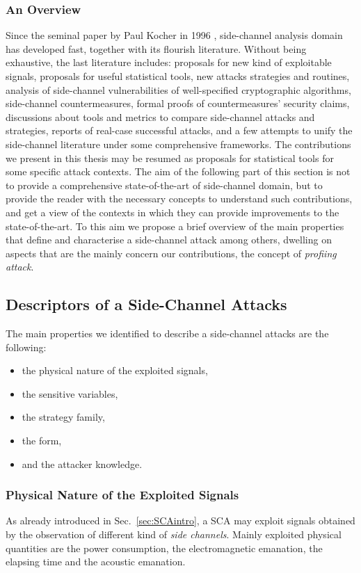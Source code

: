 \subsubsection{An Overview}
Since the seminal paper by Paul Kocher in 1996 \cite{kocher1996timing}, side-channel analysis domain has developed fast, together with its flourish literature. Without being exhaustive, the last literature includes: proposals for new kind of exploitable signals, proposals for useful statistical tools, new attacks strategies and routines, analysis of side-channel vulnerabilities of well-specified cryptographic algorithms, side-channel countermeasures, formal proofs of countermeasures' security claims, discussions about tools and metrics to compare side-channel attacks and strategies, reports of real-case successful attacks, and a few attempts to unify the side-channel literature under some comprehensive frameworks. The contributions we present in this thesis may be resumed as proposals for statistical tools for some specific attack contexts. The aim of the following part of this section is not to provide a comprehensive state-of-the-art of side-channel domain, but to provide the reader with the necessary concepts to understand such contributions, and get a view of the contexts in which they can provide improvements to the state-of-the-art. To this aim we propose a brief overview of the main properties that define and characterise a side-channel attack among others, dwelling on aspects that are the mainly concern our contributions, \eg the concept of \emph{profiing attack}. 

\subsection{Descriptors of a Side-Channel Attacks}
The main properties we identified to describe a side-channel attacks are the following:
\begin{itemize}
\item the physical nature of the exploited signals,
\item the sensitive variables,
\item the strategy family,
\item the form,
\item and the attacker knowledge.
\end{itemize} 

\subsubsection{Physical Nature of the Exploited Signals}\label{sec:physical_signals}
As already introduced in Sec.~\ref{sec:SCAintro}, a SCA may exploit signals obtained by the observation of different kind of \emph{side channels}. Mainly exploited physical quantities are the power consumption, the electromagnetic emanation, the elapsing time and the acoustic emanation. 

